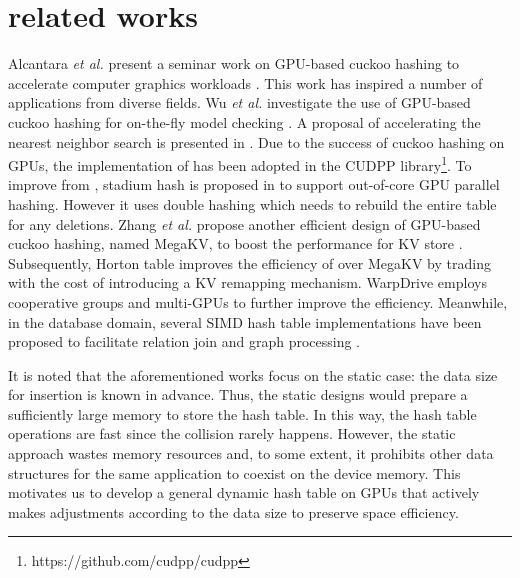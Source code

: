 \section{related works}\label{sec:rel}
Alcantara \textit{et al.} present a seminar work on GPU-based cuckoo hashing to accelerate computer graphics workloads \cite{alcantara2009real}. 
This work has inspired a number of applications from diverse fields. Wu \textit{et al.} investigate the use of GPU-based cuckoo hashing for
on-the-fly model checking \cite{wu2015gpu}. A proposal of accelerating the nearest neighbor search is presented in \cite{pan2010efficient}. 
Due to the success of cuckoo hashing on GPUs, the implementation of \cite{alcantara2009real} has been adopted in the CUDPP library\footnote{https://github.com/cudpp/cudpp}.
To improve from \cite{alcantara2009real}, stadium hash is proposed in \cite{khorasani2015stadium} to support out-of-core GPU parallel hashing. However it uses double hashing which needs to rebuild the entire table for any deletions.  
Zhang \textit{et al.} propose another efficient design of GPU-based cuckoo hashing, named MegaKV, 
to boost the performance for KV store \cite{zhang2015mega}. 
Subsequently, Horton table \cite{breslow2016horton} improves the efficiency of  over MegaKV by trading with the cost of introducing a KV remapping mechanism.
WarpDrive \cite{junger2018warpdrive} employs cooperative groups and multi-GPUs to further improve the efficiency.
Meanwhile, in the database domain, several SIMD hash table implementations have been proposed to facilitate relation join and graph processing \cite{ross2007efficient,zhong2014medusa}. 

It is noted that the aforementioned works focus on the static case: the data size for insertion is known in advance. Thus, the static designs would prepare a sufficiently large memory to store the hash table. In this way, the hash table operations are fast since the collision rarely happens. However, the static approach wastes memory resources and, to some extent, it prohibits other data structures for the same application to coexist on the device memory. 
This motivates us to develop a general dynamic hash table on GPUs that actively makes adjustments according to the data size to preserve space efficiency. 

